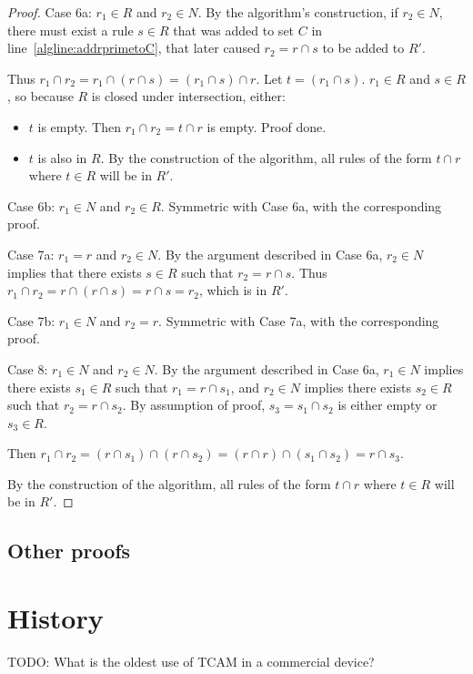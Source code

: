 \documentclass[acmsmall]{acmart}
\newcommand{\todo}[1]{}
\renewcommand{\todo}[1]{{\color{red} TODO: {#1}}}
\begin{document}
\begin{proof}
Case 6a: $r_1 \in R$ and $r_2 \in N$.
By the algorithm's construction, if $r_2 \in N$,
there must exist a rule $s \in R$ that was added to set $C$
in line~\ref{algline:addrprimetoC},
that later caused $r_2 = r \cap s$ to be added to $R'$.

Thus
    $r_1 \cap r_2
  = r_1 \cap (r \cap s)
  = (r_1 \cap s) \cap r$.
Let $t = (r_1 \cap s)$.
$r_1 \in R$ and $s \in R$,
so because $R$ is closed under intersection, either:
\begin{itemize}
\item $t$ is empty.  Then $r_1 \cap r_2 = t \cap r$ is empty.  Proof done.
\item $t$ is also in $R$.
  By the construction of the algorithm, all rules of the form $t \cap r$
  where $t \in R$ will be in $R'$.
\end{itemize}

Case 6b: $r_1 \in N$ and $r_2 \in R$.
Symmetric with Case 6a, with the corresponding proof.

Case 7a: $r_1 = r$ and $r_2 \in N$.
By the argument described in Case 6a, $r_2 \in N$
implies that there exists $s \in R$ such that $r_2 = r \cap s$.
Thus $r_1 \cap r_2 = r \cap (r \cap s) = r \cap s = r_2$,
which is in $R'$.

Case 7b: $r_1 \in N$ and $r_2 = r$.
Symmetric with Case 7a, with the corresponding proof.

Case 8: $r_1 \in N$ and $r_2 \in N$.
By the argument described in Case 6a,
$r_1 \in N$ implies there exists $s_1 \in R$ such that $r_1 = r \cap s_1$,
and
$r_2 \in N$ implies there exists $s_2 \in R$ such that $r_2 = r \cap s_2$.
By assumption of proof, $s_3 = s_1 \cap s_2$ is either
empty or $s_3 \in R$.

Then
 $r_1 \cap r_2
= (r \cap s_1) \cap (r \cap s_2)
= (r \cap r) \cap (s_1 \cap s_2)
= r \cap s_3$.

By the construction of the algorithm, all rules of the form $t \cap r$
where $t \in R$ will be in $R'$.
\end{proof}

\subsection{Other proofs}


\section{History}

\todo{What is the oldest use of TCAM in a commercial device?}
\end{document}

